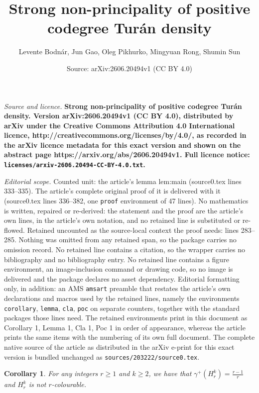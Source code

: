 \documentclass[10pt,a4paper]{amsart}
\title{\bf\Large Strong non-principality of positive codegree Tur\'an density}
\author{Levente Bodn\'ar, Jun Gao, Oleg Pikhurko, Mingyuan Rong, Shumin Sun}
\date{Source: arXiv:2606.20494v1 (CC BY 4.0)}
\newtheorem{corollary}{Corollary}
\begin{document}
\maketitle

\noindent\emph{Source and licence.} \bf\Large Strong non-principality of positive codegree Tur\'an density. Version arXiv:2606.20494v1 (CC BY 4.0), distributed by arXiv under the Creative Commons Attribution 4.0 International licence, http://creativecommons.org/licenses/by/4.0/, as recorded in the arXiv licence metadata for this exact version and shown on the abstract page https://arxiv.org/abs/2606.20494v1. Full licence notice: \texttt{licenses/arxiv-2606.20494-CC-BY-4.0.txt}.\par\smallskip

\noindent\textit{Editorial scope.} Counted unit: the article's lemma lem:main (source0.tex lines 333--335). The article's complete original proof of it is delivered with it (source0.tex lines 336--382, one \texttt{proof} environment of 47 lines). No mathematics is written, repaired or re-derived: the statement and the proof are the article's own lines, in the article's own notation, and no retained line is substituted or re-flowed.  Retained uncounted as the source-local context the proof needs: lines 283--285.  Nothing was omitted from any retained span, so the package carries no omission record.  No retained line contains a citation, so the wrapper carries no bibliography and no bibliography entry.  No retained line contains a figure environment, an image-inclusion command or drawing code, so no image is delivered and the package declares no asset dependency.  Editorial formatting only, in addition: an AMS \texttt{amsart} preamble that restates the article's own declarations and macros used by the retained lines, namely the environments \texttt{corollary}, \texttt{lemma}, \texttt{cla}, \texttt{poc} on separate counters, together with the standard packages those lines need.  The retained environments print in this document as Corollary 1, Lemma 1, Cla 1, Poc 1 in order of appearance, whereas the article prints the same items with the numbering of its own full document.  The complete native source of the article as distributed in the arXiv e-print for this exact version is bundled unchanged as \texttt{sources/203222/source0.tex}.
\begin{corollary}\label{thm:H graph}
    For any integers $r\ge 1$ and $k\ge 2$, we have that $\gamma^+(H_r^k)=\frac{r-1}{r}$ and $H_r^k$ is not $r$-colourable.
\end{corollary}
\end{document}
